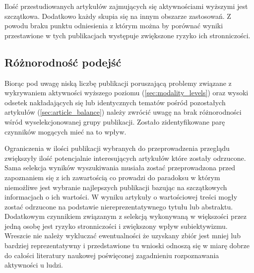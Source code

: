Ilość przestudiowanych artykułów zajmujących się aktywnościami wyższymi jest szczątkowa. Dodatkowo każdy skupia się na innym obszarze zastosowań. Z powodu braku punktu odniesienia z którym można by porównać wyniki przestawione w tych publikacjach występuje zwiększone ryzyko ich stronniczości. 

\subsection{Różnorodność podejść}
Biorąc pod uwagę niską liczbę publikacji poruszającą problemy związane z wykrywaniem aktywności wyższego poziomu (\ref{sec:modality_levels}) oraz wysoki odsetek nakładających się lub identycznych tematów pośród pozostałych artykułów (\ref{sec:article_balance}) należy zwrócić uwagę na brak różnorodności wśród wyselekcjonowanej grupy publikacji. Zostało zidentyfikowane parę czynników mogących mieć na to wpływ. 

Ograniczenia w ilości publikacji wybranych do przeprowadzenia przeglądu zwiększyły ilość potencjalnie interesujących artykułów które zostały odrzucone. Sama selekcja wyników wyszukiwania musiała zostać przeprowadzona przed zapoznaniem się z ich zawartością co prowadzi do paradoksu w którym niemożliwe jest wybranie najlepszych publikacji bazując na szczątkowych informacjach o ich wartości. W wyniku artykuły o wartościowej treści mogły zostać odrzucone na podstawie niereprezentatywnego tytułu lub abstraktu. Dodatkowym czynnikiem związanym z selekcją wykonywaną w większości przez jedną osobę jest ryzyko stronniczości i zwiększony wpływ subiektywizmu. Wreszcie nie należy wykluczać ewentualności że uzyskany zbiór jest mniej lub bardziej reprezentatywny i przedstawione tu wnioski odnoszą się w miarę dobrze do całości literatury naukowej poświęconej zagadnieniu rozpoznawania aktywności u ludzi.
